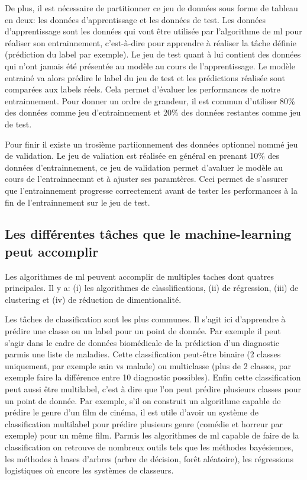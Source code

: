 De plus, il est nécessaire de partitionner ce jeu de données sous forme de tableau en deux: les données d'apprentissage et les données de test. Les données d'apprentissage sont les données qui vont être utilisée par l'algorithme de \gls{ml} pour réaliser son entrainnement, c'est-à-dire pour apprendre à réaliser la tâche définie (prédiction du label par exemple). Le jeu de test quant à lui contient des données qui n'ont jamais été présentée au modèle au cours de l'apprentissage. Le modèle entrainé va alors prédire le label du jeu de test et les prédictions réalisée sont comparées aux labels réels. Cela permet d'évaluer les performances de notre entrainnement. Pour donner un ordre de grandeur, il est commun d'utiliser 80\% des données comme jeu d'entrainnement et 20\% des données restantes comme jeu de test.

Pour finir il existe un trosième partiionnement des données optionnel nommé jeu de validation. Le jeu de valiation est réalisée en général en prenant 10\% des données d'entrainnement, ce jeu de validation permet d'avaluer le modèle au cours de l'entrainneemnt et à ajuster ses paramtères. Ceci permet de s'assurer que l'entrainnement progresse correctement avant de tester les performances à la fin de l'entrainnement sur le jeu de test.

\subsection{Les différentes tâches que le machine-learning peut accomplir}
Les algorithmes de \gls{ml} peuvent accomplir de multiples taches dont quatres principales. Il y a: (i) les algorithmes de classlifications, (ii) de régression, (iii) de clustering et (iv) de réduction de dimentionalité.

Les tâches de classification sont les plus communes. Il s'agit ici d'apprendre à prédire une classe ou un label pour un point de donnée. Par exemple il peut s'agir dans le cadre de données biomédicale de la prédiction d'un diagnostic parmis une liste de maladies. Cette classification peut-être binaire (2 classes uniquement, par exemple sain vs malade) ou multiclasse (plus de 2 classes, par exemple faire la différence entre 10 diagnostic possibles). Enfin cette classification peut aussi être multilabel, c'est à dire que l'on peut prédire plusieurs classes pour un point de donnée. Par exemple, s'il on construit un algorithme capable de prédire le genre d'un film de cinéma, il est utile d'avoir un système de classification multilabel pour prédire plusieurs genre (comédie et horreur par exemple) pour un même film. Parmis les algorithmes de \gls{ml} capable de faire de la classification on retrouve de nombreux outils tels que les méthodes bayésiennes, les méthodes à bases d'arbres (arbre de décision, forêt aléatoire), les régressions logistiques où encore les systèmes de classeurs.

